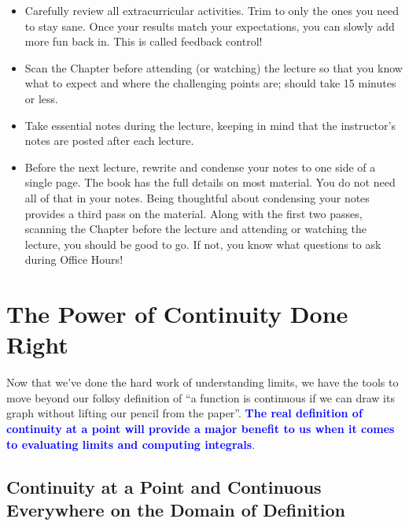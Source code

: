 \begin{tcolorbox}[title = {This can be the Point where the Wheels Come off the Track!}, sharp corners, colback=lightgold, colframe=black, coltitle=white, breakable, fonttitle=\bfseries]
\begin{itemize}
\begin{itemize}
    \item Carefully review all extracurricular activities. Trim to only the ones you need to stay sane. Once your results match your expectations, you can slowly add more fun back in. This is called feedback control! 
    \item Scan the Chapter before attending (or watching) the lecture so that you know what to expect and where the challenging points are; should take 15 minutes or less.
    \item Take essential notes during the lecture, keeping in mind that the instructor's notes are posted after each lecture.
    \item Before the next lecture, rewrite and condense your notes to one side of a single page. The book has the full details on most material. You do not need all of that in your notes. Being thoughtful about condensing your notes provides a third pass on the material. Along with the first two passes, scanning the Chapter before the lecture and attending or watching the lecture, you should be good to go. If not, you know what questions to ask during Office Hours!
\end{itemize}
\end{itemize}

\end{tcolorbox}

\bigskip



\section{The Power of Continuity Done Right} 

Now that we've done the hard work of understanding limits, we have the tools to move beyond our folksy definition of ``a function is continuous if we can draw its graph without lifting our pencil from the paper''. \textcolor{blue}{\bf The real definition of continuity at a point will provide a major benefit to us when it comes to evaluating limits and computing integrals}.

\subsection{Continuity at a Point and Continuous Everywhere on the Domain of Definition}

